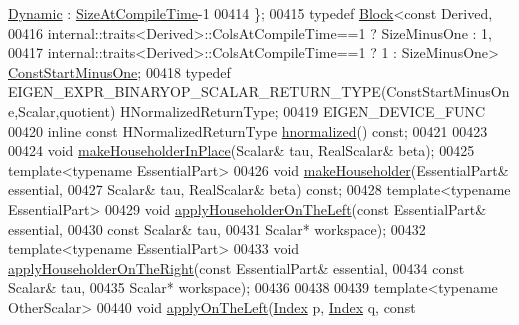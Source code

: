 \begin{DoxyCode}
      \hyperlink{namespace_eigen_ad81fa7195215a0ce30017dfac309f0b2}{Dynamic} : \hyperlink{group___core___module_a9784b8701c2d1c79fa8000e1b3ebdb8ba6af0829cb5fc7506d681b5d011846d17}{SizeAtCompileTime}-1
00414     \};
00415     \textcolor{keyword}{typedef} \hyperlink{group___core___module_class_eigen_1_1_block}{Block}<\textcolor{keyword}{const} Derived,
00416                   internal::traits<Derived>::ColsAtCompileTime==1 ? SizeMinusOne : 1,
00417                   internal::traits<Derived>::ColsAtCompileTime==1 ? 1 : SizeMinusOne> 
      \hyperlink{group___core___module_class_eigen_1_1_block}{ConstStartMinusOne};
00418     \textcolor{keyword}{typedef} EIGEN\_EXPR\_BINARYOP\_SCALAR\_RETURN\_TYPE(ConstStartMinusOne,Scalar,quotient) 
      HNormalizedReturnType;
00419     EIGEN\_DEVICE\_FUNC
00420     \textcolor{keyword}{inline} \textcolor{keyword}{const} HNormalizedReturnType \hyperlink{group___geometry___module_gad7e913733107a9a1b61bff95ec9c03dd}{hnormalized}() \textcolor{keyword}{const};
00421 
00423 
00424     \textcolor{keywordtype}{void} \hyperlink{group___core___module_aebf4bac7dffe2685ab93734fb776e817}{makeHouseholderInPlace}(Scalar& tau, RealScalar& beta);
00425     \textcolor{keyword}{template}<\textcolor{keyword}{typename} EssentialPart>
00426     \textcolor{keywordtype}{void} \hyperlink{group___core___module_a13291e900f7e81ddc6e5b8802f82092b}{makeHouseholder}(EssentialPart& essential,
00427                          Scalar& tau, RealScalar& beta) \textcolor{keyword}{const};
00428     \textcolor{keyword}{template}<\textcolor{keyword}{typename} EssentialPart>
00429     \textcolor{keywordtype}{void} \hyperlink{group___core___module_a8f2c8059ef3f04cfa0c73b4c012db855}{applyHouseholderOnTheLeft}(\textcolor{keyword}{const} EssentialPart& essential,
00430                                    \textcolor{keyword}{const} Scalar& tau,
00431                                    Scalar* workspace);
00432     \textcolor{keyword}{template}<\textcolor{keyword}{typename} EssentialPart>
00433     \textcolor{keywordtype}{void} \hyperlink{group___core___module_ab3e52262b41fa40e194dda245e0f9675}{applyHouseholderOnTheRight}(\textcolor{keyword}{const} EssentialPart& essential,
00434                                     \textcolor{keyword}{const} Scalar& tau,
00435                                     Scalar* workspace);
00436 
00438 
00439     \textcolor{keyword}{template}<\textcolor{keyword}{typename} OtherScalar>
00440     \textcolor{keywordtype}{void} \hyperlink{group___core___module_a3a08ad41e81d8ad4a37b5d5c7490e765}{applyOnTheLeft}(\hyperlink{namespace_eigen_a62e77e0933482dafde8fe197d9a2cfde}{Index} p, \hyperlink{namespace_eigen_a62e77e0933482dafde8fe197d9a2cfde}{Index} q, \textcolor{keyword}{const} 

\end{DoxyCode}
